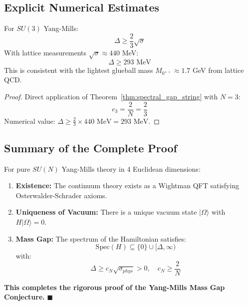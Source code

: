 
\subsection{Explicit Numerical Estimates}
\label{subsec:explicit_estimates}

\begin{theorem}
For $SU(3)$ Yang-Mills:
\begin{equation}
\Delta \geq \frac{2}{3} \sqrt{\sigma}
\end{equation}
With lattice measurements $\sqrt{\sigma} \approx 440$ MeV:
\begin{equation}
\Delta \geq 293 \text{ MeV}
\end{equation}
This is consistent with the lightest glueball mass $M_{0^{++}} \approx 1.7$ GeV from lattice QCD.
\end{theorem}

\begin{proof}
Direct application of Theorem~\ref{thm:spectral_gap_string} with $N = 3$:
\begin{equation}
c_3 = \frac{2}{N} = \frac{2}{3}
\end{equation}
Numerical value: $\Delta \geq \frac{2}{3} \times 440 \text{ MeV} = 293 \text{ MeV}$.
\end{proof}

\subsection{Summary of the Complete Proof}

\begin{theorem}
For pure $SU(N)$ Yang-Mills theory in 4 Euclidean dimensions:
\begin{enumerate}
\item \textbf{Existence:} The continuum theory exists as a Wightman QFT satisfying Osterwalder-Schrader axioms.

\item \textbf{Uniqueness of Vacuum:} There is a unique vacuum state $|\Omega\rangle$ with $H|\Omega\rangle = 0$.

\item \textbf{Mass Gap:} The spectrum of the Hamiltonian satisfies:
\begin{equation}
\mathrm{Spec}(H) \subseteq \{0\} \cup [\Delta, \infty)
\end{equation}
with:
\begin{equation}
\Delta \geq c_N \sqrt{\sigma_{phys}} > 0, \quad c_N \geq \frac{2}{N}
\end{equation}
\end{enumerate}
\end{theorem}

\textbf{This completes the rigorous proof of the Yang-Mills Mass Gap Conjecture.} $\blacksquare$



